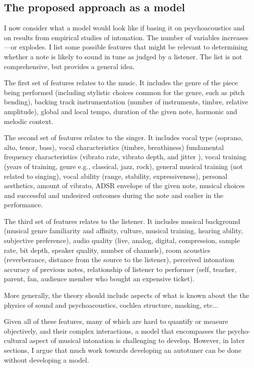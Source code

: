 \subsection{The proposed approach as a model}
I now consider what a model would look like if basing it on psychoacoustics and on results from empirical studies of intonation. The number of variables increases---or explodes. I list some possible features that might be relevant to determining whether a note is likely to sound in tune as judged by a listener. The list is not comprehensive, but provides a general idea.

The first set of features relates to the music. It includes the genre of the piece being performed (including stylistic choices common for the genre, such as pitch bending), backing track instrumentation (number of instruments, timbre, relative amplitude), global and local tempo, duration of the given note, harmonic and melodic context.

The second set of features relates to the singer. It includes vocal type (soprano, alto, tenor, bass), vocal characteristics (timbre, breathiness) fundamental frequency characteristics (vibrato rate, vibrato depth, and jitter \cite{devaney2020new}), vocal training (years of training, genre e.g., classical, jazz, rock), general musical training (not related to singing), vocal ability (range, stability, expressiveness), personal aesthetics, amount of vibrato, ADSR envelope of the given note, musical choices and successful and undesired outcomes during the note and earlier in the performance.

The third set of features relates to the listener. It includes musical background (musical genre familiarity and affinity, culture, musical training, hearing ability, subjective preference), audio quality (live, analog, digital, compression, sample rate, bit depth, speaker quality, number of channels), room acoustics (reverberance, distance from the source to the listener), perceived intonation accuracy of previous notes, relationship of listener to performer (self, teacher, parent, fan, audience member who bought an expensive ticket).

More generally, the theory should include aspects of what is known about the the physics of sound and psychoacoustics, cochlea structure, masking, etc...

Given all of these features, many of which are hard to quantify or measure objectively, and their complex interactions, a model that encompasses the psycho-cultural aspect of musical intonation is challenging to develop. However, in later sections, I argue that much work towards developing an autotuner can be done without developing a model.

